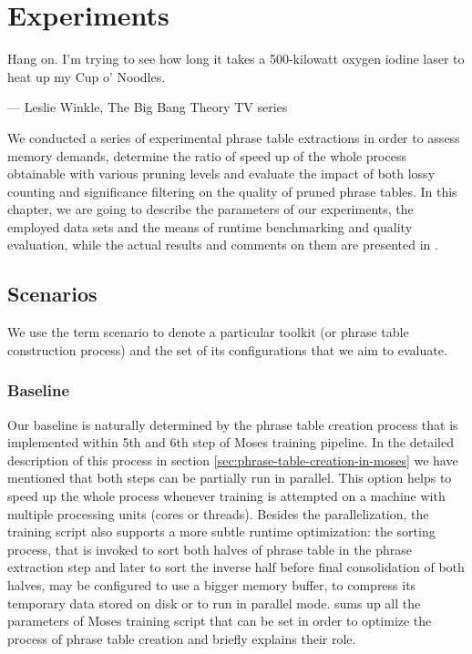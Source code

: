 \chapter{Experiments}
\label{chap:experiments}

\setlength{\epigraphwidth}{1.0\textwidth}
\epigraph{Hang on. I'm trying to see how long it takes a 500-kilowatt oxygen iodine laser to heat up my Cup o' Noodles.}{--- Leslie Winkle, The Big Bang Theory TV series}

We conducted a series of experimental phrase table extractions in order to
assess \eppex{} memory demands, determine the ratio of speed up of the whole
process obtainable with various pruning levels and evaluate the impact of both
lossy counting and significance filtering on the quality of pruned phrase tables.
In this chapter, we are going to describe the parameters of our experiments,
the employed data sets and the means of runtime benchmarking and quality
evaluation, while the actual results and comments on them are presented in
.

\section{Scenarios}

We use the term scenario to denote a particular toolkit (or phrase table construction process)
and the set of its configurations that we aim to evaluate.

\subsection{Baseline}

Our baseline is naturally determined by the phrase table creation process
that is implemented within 5th and 6th step of Moses training pipeline.
In the detailed description of this process in section \ref{sec:phrase-table-creation-in-moses}
we have mentioned that both steps can be partially run in parallel.
This option helps to speed up the whole process whenever training is
attempted on a machine with multiple processing units (cores or threads).
Besides the parallelization, the training script also supports a more subtle
runtime optimization: the sorting process, that is invoked to sort both halves
of phrase table in the phrase extraction step and later to sort the inverse
half before final consolidation of both halves, may be configured to use a bigger
memory buffer, to compress its temporary data stored on disk or to run in parallel mode.
 sums up all the parameters of Moses
training script that can be set in order to optimize the process of phrase
table creation and briefly explains their role.

